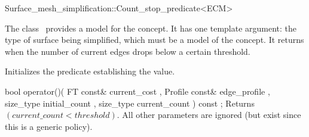 

\begin{ccRefFunctionObjectClass}{Surface_mesh_simplification::Count_stop_predicate<ECM>}


\ccDefinition

The class \ccRefName\ provides a model for the  concept.
It has one template argument: the type of surface being simplified,
which must be a model of the  concept.
It returns  when the number of current edges drops below a certain threshold.


\ccIsModel
{}

\ccCreation
{}  

{Initializes the predicate establishing the  value.} 

\ccTagFullDeclarations
\ccOperations
{}

  \ccMemberFunction
    {bool operator()( FT const&      current_cost
                    , Profile const& edge_profile
                    , size_type      initial_count
                    , size_type      current_count
                    ) const ;
           }
  {Returns $(current\_count < threshold)$. All other parameters are ignored (but exist since this is a generic policy).}

\ccSeeAlso
{}

\end{ccRefFunctionObjectClass}



